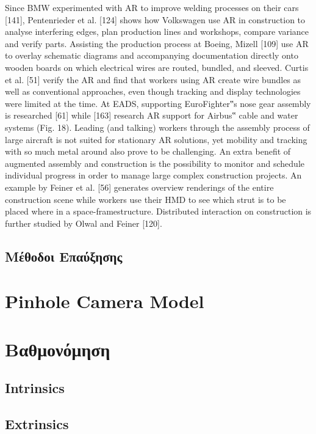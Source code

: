 Since BMW experimented with AR to improve welding
processes on their cars [141], Pentenrieder et al. [124] shows
how Volkswagen use AR in construction to analyse interfering
edges, plan production lines and workshops, compare
variance and verify parts. Assisting the production process at
Boeing, Mizell [109] use AR to overlay schematic diagrams
and accompanying documentation directly onto wooden
boards on which electrical wires are routed, bundled, and
sleeved. Curtis et al. [51] verify the AR and find that workers
using AR create wire bundles as well as conventional approaches,
even though tracking and display technologies
were limited at the time.
At EADS, supporting EuroFighter‟s nose gear assembly is
researched [61] while [163] research AR support for Airbus‟
cable and water systems (Fig. 18). Leading (and talking)
workers through the assembly process of large aircraft is not
suited for stationary AR solutions, yet mobility and tracking
with so much metal around also prove to be challenging.
An extra benefit of augmented assembly and construction
is the possibility to monitor and schedule individual progress
in order to manage large complex construction projects. An
example by Feiner et al. [56] generates overview renderings
of the entire construction scene while workers use their HMD
to see which strut is to be placed where in a space-framestructure. Distributed interaction on construction is further
studied by Olwal and Feiner [120].
\subsection{Μέθοδοι Επαύξησης}



\section{Pinhole Camera Model}

\section{Βαθμονόμηση}

\subsection{Intrinsics}
\subsection{Extrinsics}




